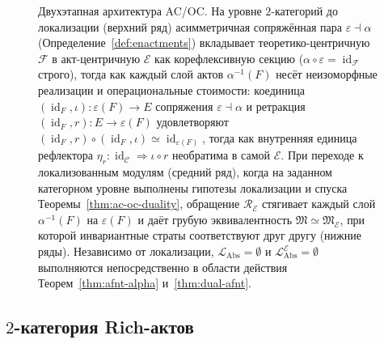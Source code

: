 \documentclass[11pt]{article}
\theoremstyle{plain}
\theoremstyle{definition}
\newcommand{\cF}{\mathcal{F}}
\newcommand{\cC}{\mathcal{C}}
\newcommand{\fM}{\mathfrak{M}}
\newcommand{\LAbs}{\mathcal{L}_{\mathrm{Abs}}}
\newcommand{\cE}{\mathcal{E}}
\newcommand{\fME}{\fM_{\cE}}
\newcommand{\LAbsE}{\LAbs^{\cE}}
\DeclareMathOperator{\id}{id}
\begin{document}
\begin{figure}[ht]
\caption[Двухэтапная архитектура дуальности теории и исполнения (AC/OC)]{Двухэтапная архитектура AC/OC. На уровне $2$-категорий до локализации (верхний ряд) асимметричная сопряжённая пара $\varepsilon \dashv \alpha$ (Определение~\ref{def:enactments}) вкладывает теоретико-центричную $\cF$ в акт-центричную $\cE$ как корефлексивную секцию ($\alpha \circ \varepsilon = \id_\cF$ строго), тогда как каждый слой актов $\alpha^{-1}(F)$ несёт неизоморфные реализации и операциональные стоимости: коединица $(\id_F, \iota) : \varepsilon(F) \to E$ сопряжения $\varepsilon \dashv \alpha$ и ретракция $(\id_F, r) : E \to \varepsilon(F)$ удовлетворяют $(\id_F, r) \circ (\id_F, \iota) \simeq \id_{\varepsilon(F)}$, тогда как внутренняя единица рефлектора $\eta_r : \id_\cC \Rightarrow \iota \circ r$ необратима в самой $\cE$. При переходе к локализованным модулям (средний ряд), когда на заданном категорном уровне выполнены гипотезы локализации и спуска Теоремы~\ref{thm:ac-oc-duality}, обращение $\mathcal{R}_\cE$ стягивает каждый слой $\alpha^{-1}(F)$ на $\varepsilon(F)$ и даёт грубую эквивалентность $\fM \simeq \fME$, при которой инвариантные страты соответствуют друг другу (нижние ряды). Независимо от локализации, $\LAbs = \emptyset$ и $\LAbsE = \emptyset$ выполняются непосредственно в области действия Теорем~\ref{thm:afnt-alpha} и~\ref{thm:dual-afnt}.}
\label{fig:ac-oc-duality}
\end{figure}

\subsection{\texorpdfstring{$2$-категория Rich-актов}{2-категория Rich-актов}}
\end{document}
